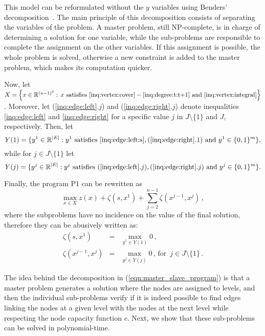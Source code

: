 This model can be reformulated without the $y$ variables using
Benders' decomposition~\cite{benders1962pps}.  The main principle of
this decomposition consists of separating the variables of the
problem. A master problem, still NP-complete, is in charge of
determining a solution for one variable, while the sub-problems are
responsible to complete the assignment on the other variables. If this
assignment is possible, the whole problem is solved, otherwise a new
constraint is added to the master problem, which makes its computation
quicker.

Now, let $X = \left\{ x \in \mathbb{R}^{(n-1)^2} : \, x \textrm{
    satisfies } \eqref{inq:vertex:cover}-\eqref{inq:degree:t:t+1}
  \textrm{ and } \eqref{inq:vertex:integral}\right\}$.  
Moreover, let (\ref{inq:edge:left}.$j$) and (\ref{inq:edge:right}.$j$) denote
inequalities \eqref{inq:edge:left} and \eqref{inq:edge:right} for a
specific value $j$ in $J\setminus\{1\}$ and $J$, respectively. Then,
let
\[Y(1) = \{y^1 \in \mathbb{R}^{|E|} : y^1 \textrm{ satisfies }
  \eqref{inq:edge:left:s}, (\ref{inq:edge:right}.1) \textrm{ and } y^1
  \in \{0,1\}^m\},\] \noindent while for $j\in
J\setminus\{1\}$ let
\[Y(j) = \{y^j \in \mathbb{R}^{|E|} : y^j \textrm{ satisfies } (\ref{inq:edge:left}.j), (\ref{inq:edge:right}.j) \textrm{ and } y^j \in \{0,1\}^m\}.\]




Finally, the program P1 can be rewritten as
\begin{equation}
  \max\limits_{x \in X} z(x) + \zeta(s,x^1) + \sum\limits_{j=2}^{n-1} \zeta(x^{j-1},x^j) \, ,
  \label{eqn:master_slave_program}
\end{equation}
where the subproblems have no incidence on the value of the final
solution, therefore they can be abusively written as:
\begin{eqnarray}\label{eq:subpb:s}
  \zeta(s,x^1) & = & \max_{y^1 \in Y(1)} 0 \, , \\
\label{eq:subpb:t}
  \zeta(x^{j-1},x^j) & = & \max_{y^j \in Y(j)} 0 \, , \, \text{for } \, j\in J\setminus\{1\} \, .
\end{eqnarray}


The idea behind the decomposition in (\ref{eqn:master_slave_program})
is that a master problem generates a solution where the nodes are
assigned to levels, and then the individual sub-problems verify if it
is indeed possible to find edges linking the nodes at a given level
with the nodes at the next level while respecting the node capacity
function $c$. Next, we show that these sub-problems can be solved in
polynomial-time.

